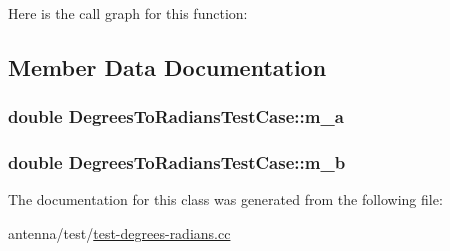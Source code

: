 Here is the call graph for this function\+:




\subsection{Member Data Documentation}
\subsubsection[{\texorpdfstring{m\+\_\+a}{m_a}}]{\setlength{\rightskip}{0pt plus 5cm}double Degrees\+To\+Radians\+Test\+Case\+::m\+\_\+a\hspace{0.3cm}{\ttfamily [private]}}\hypertarget{classDegreesToRadiansTestCase_a552e2b2148dc2c7518cb48e095322d01}{}\label{classDegreesToRadiansTestCase_a552e2b2148dc2c7518cb48e095322d01}
\subsubsection[{\texorpdfstring{m\+\_\+b}{m_b}}]{\setlength{\rightskip}{0pt plus 5cm}double Degrees\+To\+Radians\+Test\+Case\+::m\+\_\+b\hspace{0.3cm}{\ttfamily [private]}}\hypertarget{classDegreesToRadiansTestCase_a16da656cfa260ab14ca4f64dba28bbef}{}\label{classDegreesToRadiansTestCase_a16da656cfa260ab14ca4f64dba28bbef}


The documentation for this class was generated from the following file\+:\begin{DoxyCompactItemize}
\item 
antenna/test/\hyperlink{test-degrees-radians_8cc}{test-\/degrees-\/radians.\+cc}\end{DoxyCompactItemize}
